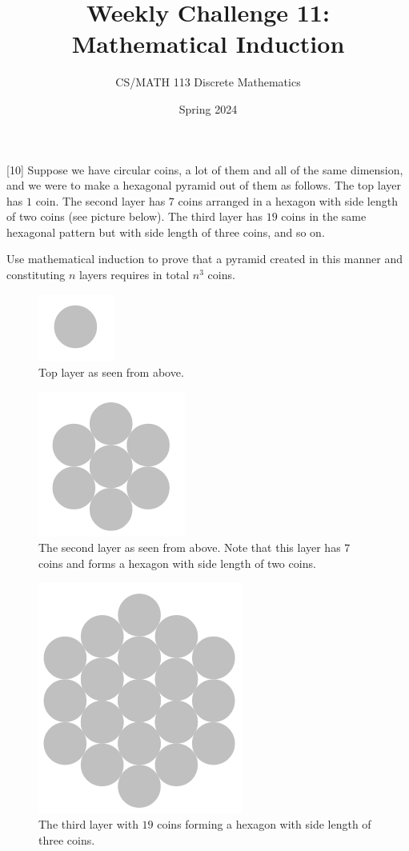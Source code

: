 \documentclass[a4paper]{exam}
\title{Weekly Challenge 11: Mathematical Induction}
\author{CS/MATH 113 Discrete Mathematics}
\date{Spring 2024}
\begin{document}
\maketitle

\begin{questions}
  [10]
    Suppose we have circular coins, a lot of them and all of the same dimension, and we were to make a hexagonal pyramid out of them as follows. The top layer has $1$ coin. The second layer has $7$ coins arranged in a hexagon with side length of two coins (see picture below). The third layer has $19$ coins in the same hexagonal pattern but with side length of three coins, and so on.

    Use mathematical induction to prove that a pyramid created in this manner and constituting $n$ layers requires in total $n^3$ coins.
  \begin{figure}[h!]
    \centerline{\includegraphics{layer1}}
    \caption{Top layer as seen from above.}
    \label{layer1}
  \end{figure}
  \begin{figure}[h!]
    \centerline{\includegraphics{layer2.png}}
    \caption{The second layer as seen from above. Note that this layer has $7$ coins and forms a hexagon with side length of two coins.}
    \label{layer2}
  \end{figure}
  \newpage
  \begin{figure}[h!]
    \centerline{\includegraphics{layer3.png}}
    \caption{The third layer with $19$ coins forming a hexagon with side length of three coins.}
    \label{layer3}
  \end{figure}


\end{questions}
\end{document}
